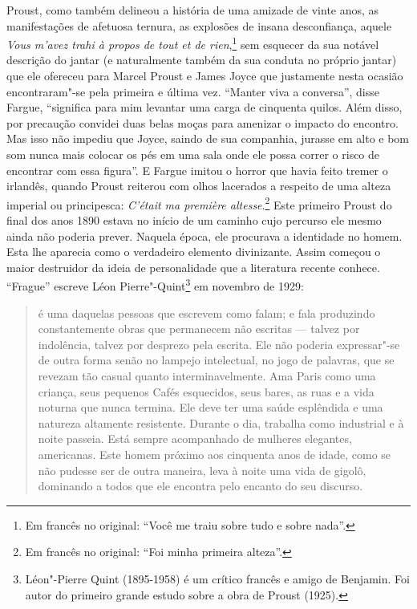 Proust, como também delineou a história de uma amizade de vinte anos, as
manifestações de afetuosa ternura, as explosões de insana desconfiança,
aquele \emph{Vous m'avez trahi à propos de tout et de rien},\footnote{Em francês no original: ``Você me traiu sobre tudo e sobre nada''. \versal{[N. T.]}}
sem esquecer da sua notável descrição do jantar (e naturalmente também
da sua conduta no próprio jantar) que ele ofereceu para Marcel Proust e
James Joyce que justamente nesta ocasião encontraram"-se pela primeira e
última vez. ``Manter viva a conversa'', disse Fargue, ``significa para
mim levantar uma carga de cinquenta quilos. Além disso, por precaução
convidei duas belas moças para amenizar o impacto do encontro. Mas isso
não impediu que Joyce, saindo de sua companhia, jurasse em alto e bom
som nunca mais colocar os pés em uma sala onde ele possa correr o risco
de encontrar com essa figura''. E Fargue imitou o horror que havia feito
tremer o irlandês, quando Proust reiterou com olhos lacerados a respeito
de uma alteza imperial ou principesca: \emph{C'était ma première
altesse}.\footnote{Em francês no original: ``Foi minha primeira alteza''. \versal{[N. T.]}} Este primeiro Proust do final dos anos 1890 estava no
início de um caminho cujo percurso ele mesmo ainda não poderia prever.
Naquela época, ele procurava a identidade no homem. Esta lhe aparecia
como o verdadeiro elemento divinizante. Assim começou o maior destruidor
da ideia de personalidade que a literatura recente conhece. ``Frague''
escreve Léon Pierre"-Quint\footnote{Léon"-Pierre Quint (1895-1958) é
  um crítico francês e amigo de Benjamin. Foi autor do primeiro grande
  estudo sobre a obra de Proust (1925). \versal{[N. E.]}} em novembro de 1929:

\begin{quote}
é uma daquelas pessoas que escrevem como falam; e fala produzindo
constantemente obras que permanecem não escritas --- talvez por
indolência, talvez por desprezo pela escrita. Ele não poderia
expressar"-se de outra forma senão no lampejo intelectual, no jogo de
palavras, que se revezam tão casual quanto interminavelmente. Ama Paris
como uma criança, seus pequenos Cafés esquecidos, seus bares, as ruas e
a vida noturna que nunca termina. Ele deve ter uma saúde esplêndida e
uma natureza altamente resistente. Durante o dia, trabalha como
industrial e à noite passeia. Está sempre acompanhado de mulheres
elegantes, americanas. Este homem próximo aos cinquenta anos de idade,
como se não pudesse ser de outra maneira, leva à noite uma vida de
gigolô, dominando a todos que ele encontra pelo encanto do seu discurso.
\end{quote}

